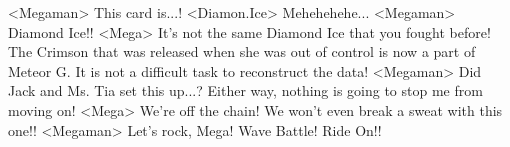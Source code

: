<Megaman> This card is...! 
<Diamon.Ice> Mehehehehe... 
<Megaman> Diamond Ice!! 
<Mega> It's not the same Diamond Ice that you fought before! 
The Crimson that was released when she was out 
of control is now a part of Meteor G. 
It is not a difficult task to reconstruct the data! 
<Megaman> Did Jack and Ms. Tia set this up...? 
Either way, nothing is going to stop me from moving on! 
<Mega> We're off the chain! We won't even break a sweat with this one!! 
<Megaman> Let's rock, Mega! 
Wave Battle! Ride On!! 
